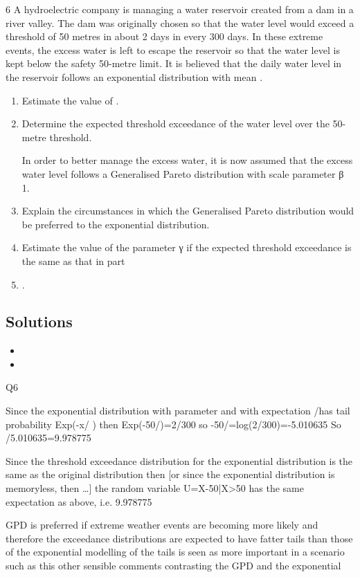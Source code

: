 \documentclass[a4paper,12pt]{article}
\begin{document}


6 A hydroelectric company is managing a water reservoir created from a dam in a river
valley. The dam was originally chosen so that the water level would exceed a
threshold of 50 metres in about 2 days in every 300 days. In these extreme events, the
excess water is left to escape the reservoir so that the water level is kept below the
safety 50-metre limit.
It is believed that the daily water level in the reservoir follows an exponential
distribution with mean \mu.

\begin{enumerate}
\item   Estimate the value of \mu. 
\item   Determine the expected threshold exceedance of the water level over the
50-metre threshold. 

In order to better manage the excess water, it is now assumed that the excess water
level follows a Generalised Pareto distribution with scale parameter β 􀵌 1.
\item  Explain the circumstances in which the Generalised Pareto distribution would
be preferred to the exponential distribution. 
\item  Estimate the value of the parameter γ if the expected threshold exceedance is
the same as that in part \item  . 
\end{enumerate}

\subsection*{Solutions}

\begin{itemize}
\item
\item
\end{itemize}



Q6
\item  
Since the exponential distribution with parameter \lambda and with expectation /\lambda has tail probability
Exp(-x/ \mu ) then 
Exp(-50/\mu)=2/300 so
-50/\mu =log(2/300)=-5.010635 
So
/5.010635=9.978775 
\item   Since the threshold exceedance distribution for the exponential distribution is the same as the original distribution then 
[or since the exponential distribution is memoryless, then …]
the random variable U=X-50|X>50 has the same expectation as above, i.e. 9.978775 
\item  GPD is preferred if extreme weather events are becoming more likely 
and therefore the exceedance distributions are expected to have fatter tails than
those of the exponential 
modelling of the tails is seen as more important in a scenario such as this 
other sensible comments contrasting the GPD and the exponential 
\end{document}

